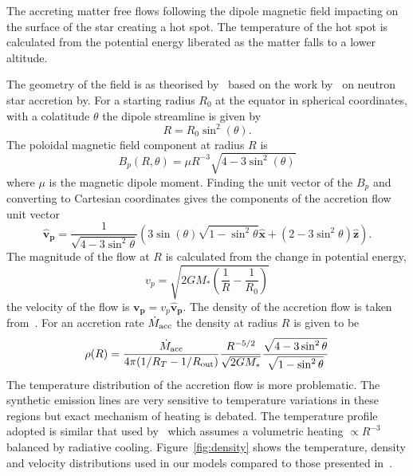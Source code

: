 \documentclass[fleqn,usenatbib]{mnras}
\begin{document}
The accreting matter free flows following the dipole magnetic field impacting on the surface of the star creating a hot spot. The temperature of the hot spot is calculated from the potential energy liberated as the matter falls to a lower altitude.

The geometry of the field is as theorised by~\citet{1991ApJ...370L..39K} based on the work by~\citet{1977ApJ...217..578G} on neutron star accretion by. For a starting radius $R_{0}$ at the equator in spherical coordinates, with a colatitude $\theta$ the dipole streamline is given by
\begin{equation}
    R = R_{0}\sin^{2}(\theta).
\end{equation}
The poloidal magnetic field component at radius $R$ is
\begin{equation}
    B_{p}(R,\theta) = \mu R^{-3}\sqrt{4-3\sin^{2}(\theta )}
\end{equation}
where $\mu$ is the magnetic dipole moment. Finding the unit vector of the $B_p$ and converting to Cartesian coordinates gives the components of the accretion flow unit vector
\begin{equation}
     \mathbf{\hat{v}_p} = \frac{1}{\sqrt{4-3\sin^2\theta}}\left(3\sin(\theta)\sqrt{1-\sin^2\theta}\mathbf{\hat{x}}+(2-3\sin^2\theta)\mathbf{\hat{z}}\right).
\end{equation}
The magnitude of the flow at $R$ is calculated from the change in potential energy,
\begin{equation}
    v_p = \sqrt{2GM_{\ast}(\frac{1}{R} - \frac{1}{R_0})}
\end{equation}
the velocity of the flow is $\mathbf{v_p}=v_p\mathbf{\hat{v}_p}$.
The density of the accretion flow is taken from~\citep{Hartmann:1994tl}. For an accretion rate $\dot{M}_{\rm acc}$ the density at radius $R$ is given to be
\begin{equation}
    \rho(R) = \frac{\dot{M}_{\rm acc}}{4\pi(1/R_T - 1/R_{\rm out})}\frac{R^{-5/2}}{\sqrt{2GM_{\ast}}}\frac{\sqrt{4-3\sin^2\theta}}{\sqrt{1-\sin^2\theta}}
\end{equation}
The temperature distribution of the accretion flow is more problematic. The synthetic emission lines are very sensitive to temperature variations in these regions but exact mechanism of heating is debated. The temperature profile adopted is similar that used by~\citet{Hartmann:1994tl,1998ApJ...492..743M} which assumes a volumetric heating $\propto R^{-3}$ balanced by radiative cooling. Figure~\ref{fig:density} shows the temperature, density and velocity distributions used in our models compared to those presented in~\citet{1998ApJ...492..743M}.
\end{document}
